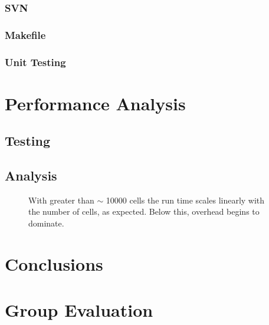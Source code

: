 \documentclass[12pt]{report}
\begin{document}
      \subsection{SVN} %
      \subsection{Makefile} %
      \subsection{Unit Testing} %

\chapter{Performance Analysis}
   \section{Testing} %
   \section{Analysis} %
   
   \begin{figure}[h]
   
   
   \caption{With greater than $\sim$ 10000 cells the run time scales linearly with the number of cells, as expected.
   Below this, overhead begins to dominate.}
   \end{figure}

\chapter{Conclusions} %

\chapter{Group Evaluation} %
\end{document}
